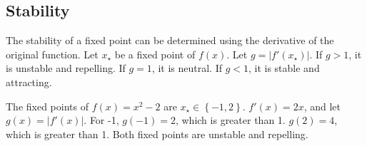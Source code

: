 \documentclass{beamer}
\begin{document}
    \subsection{Stability}
    \begin{frame}
        The stability of a fixed point can be determined using the derivative of the original function. Let $x_{\star}$ be a fixed point of $f(x)$. Let $g=|f'(x_\star)|$. If $g>1$, it is unstable and repelling. If $g=1$, it is neutral. If $g<1$, it is stable and attracting.
        \begin{example}
            The fixed points of $f(x)=x^2-2$ are $x_\star \in \left\{-1,2\right\}$. $f'(x)=2x$, and let $g(x)=|f'(x)|$. For -1, $g(-1)=2$, which is greater than 1. $g(2)=4$, which is greater than 1. Both fixed points are unstable and repelling.
        \end{example}
    \end{frame}
\end{document}

